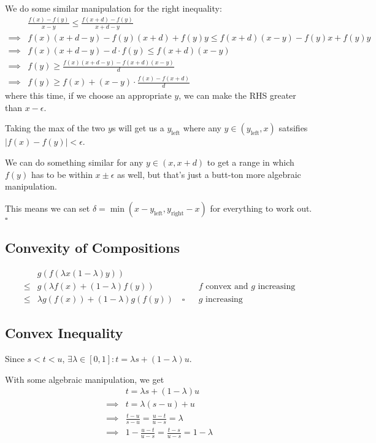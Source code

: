 \documentclass[12pt]{article}
\begin{document}
We do some similar manipulation for the right inequality:
\begin{align*}
             & \frac{f(x)-f(y)}{x-y} \le \frac{f(x+d)-f(y)}{x+d-y}         \\
  \implies{} & f(x)(x+d-y)-f(y)(x+d)+f(y)y \le f(x+d)(x-y) - f(y)x + f(y)y \\
  \implies{} & f(x)(x+d-y)-d \cdot f(y) \le f(x+d)(x-y)                    \\
  \implies{} & f(y) \ge \frac{f(x)(x+d-y)-f(x+d)(x-y)}{d}                  \\
  \implies{} & f(y) \ge f(x)+(x-y) \cdot \frac{f(x)-f(x+d)}{d}
\end{align*}
where this time, if we choose an appropriate $y$, we can make the RHS greater than $x-\epsilon$.

Taking the max of the two $y$s will get us a $y_\text{left}$
where any $y \in (y_\text{left}, x)$ satsifies $|f(x)-f(y)| < \epsilon$.

We can do something similar for any $y \in (x, x+d)$ to get a range
in which $f(y)$ has to be within $x \pm \epsilon$ as well,
but that's just a butt-ton more algebraic manipulation.

This means we can set $\delta=\min(x-y_\text{left}, y_\text{right}-x)$ for everything to work out. $\square$

\pagebreak

\subsection{Convexity of Compositions}

\[\begin{aligned}
          & g(f(\lambda x (1-\lambda)y))                                                                \\
    \le{} & g(\lambda f(x) + (1 - \lambda) f(y))              &  & \text{$f$ convex and $g$ increasing} \\
    \le{} & \lambda g(f(x)) + (1-\lambda) g(f(y))\quad\square &  & \text{$g$ increasing}
  \end{aligned}\]

\subsection{Convex Inequality}\label{sec:prob2p3}

Since $s < t < u$, $\exists \lambda \in [0, 1]: t = \lambda s + (1 - \lambda)u$.

With some algebraic manipulation, we get
\begin{align*}
             & t = \lambda s + (1 - \lambda)u               \\
  \implies{} & t = \lambda(s-u)+u                           \\
  \implies{} & \frac{t-u}{s-u} = \frac{u-t}{u-s}= \lambda   \\
  \implies{} & 1-\frac{u-t}{u-s}=\frac{t-s}{u-s}= 1-\lambda
\end{align*}
\end{document}
